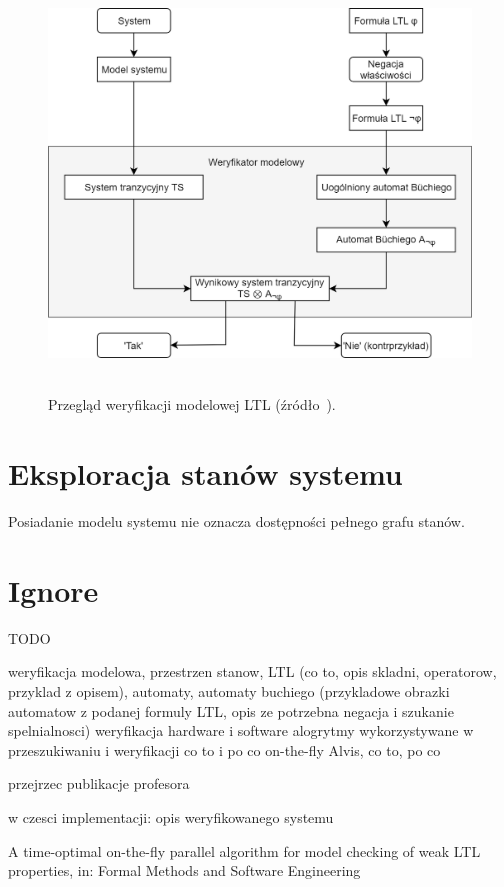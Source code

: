 \begin{figure}[h]
    \centering
    \includegraphics[height=11cm,keepaspectratio]{img/ltl_model_checking_overview.png}
    \caption{Przegląd weryfikacji modelowej LTL (źródło~\cite{Bai08}).}
    \label{fig:ltl_model_checking}
\end{figure}


\section{Eksploracja stanów systemu}

Posiadanie modelu systemu nie oznacza dostępności pełnego grafu stanów.


\section{Ignore}

TODO

weryfikacja modelowa, przestrzen stanow, LTL (co to, opis skladni, operatorow, przyklad z opisem), automaty, automaty buchiego (przykladowe obrazki automatow z podanej formuly LTL, opis ze potrzebna negacja i szukanie spelnialnosci)
weryfikacja hardware i software
alogrytmy wykorzystywane w przeszukiwaniu i weryfikacji
co to i po co on-the-fly
Alvis, co to, po co

\cite{Bar12} \cite{Jac05}
przejrzec publikacje profesora


w czesci implementacji:
opis weryfikowanego systemu


A time-optimal on-the-fly parallel algorithm for model checking of weak LTL properties, in: Formal Methods and Software Engineering

